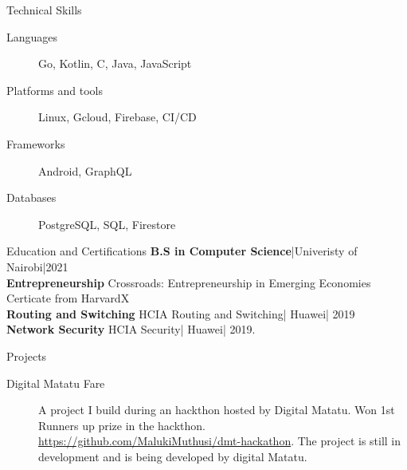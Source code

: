 \documentclass[a4paper]{article}
\begin{document}
{\centering Technical Skills}
\begin{description}
    \item[Languages] Go, Kotlin, C, Java, JavaScript
    \item[Platforms and tools] Linux, Gcloud, Firebase, CI/CD
    \item[Frameworks] Android, GraphQL
    \item[Databases] PostgreSQL, SQL, Firestore
\end{description}

{\centering Education and Certifications}
\textbf{B.S in Computer Science}|Univeristy of Nairobi|2021 \\
\textbf{Entrepreneurship} Crossroads: Entrepreneurship in Emerging Economies Certicate from HarvardX \\
\textbf{Routing and Switching} HCIA Routing and Switching| Huawei| 2019 \\
\textbf{Network Security} HCIA Security| Huawei| 2019. \par

{\centering Projects}
\begin{description}
    \item[Digital Matatu Fare] A project I build during an hackthon hosted by Digital Matatu. Won 1st Runners up prize in the hackthon. \url{ https://github.com/MalukiMuthusi/dmt-hackathon}. The project is still in development and is being developed by digital Matatu.
\end{description}
\end{document}
